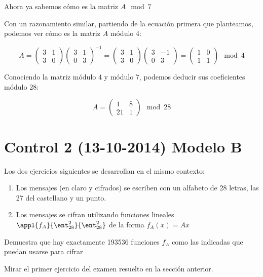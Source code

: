 \begin{problem}[2]
 Ahora ya sabemos cómo es la matriz $A \mod 7$

 Con un razonamiento similar, partiendo de la ecuación primera que planteamos, podemos ver cómo es la matriz $A$ módulo 4:

 \[A = \left( \begin{array}{cc}
  3 & 1 \\
  3 & 0
  \end{array} \right) \left( \begin{array}{cc}
  3 & 1 \\
  0 & 3
  \end{array} \right)^{-1} = \left( \begin{array}{cc}
  3 & 1 \\
  3 & 0
  \end{array} \right) \left( \begin{array}{cc}
  3 & -1 \\
  0 & 3
  \end{array} \right) = \left( \begin{array}{cc}
  1 & 0 \\
  1 & 1
  \end{array} \right) \mod 4\]

 Conociendo la matriz módulo 4 y módulo 7, podemos deducir sus coeficientes módulo 28:

 \[A = \left( \begin{array}{cc}
  1 & 8\\
  21 & 1
  \end{array} \right) \mod 28\]
\end{problem}


\section{Control 2 (13-10-2014) Modelo B}

Los dos ejercicios siguientes se desarrollan en el mismo contexto:

\begin{enumerate}
\item Los mensajes (en claro y cifrados) se escriben con un alfabeto de 28 letras, las 27 del castellano y un punto.

\item Los mensajes se cifran utilizando funciones lineales $\appl{f_A}{\ent_{28}^2}{\ent_{28}^2}$ de la forma $f_A(x) = Ax$
\end{enumerate}

\begin{problem}[1]
Demuestra que hay exactamente 193536 funciones $f_A$ como las indicadas que puedan usarse para cifrar

\solution


Mirar el primer ejercicio del examen resuelto en la sección anterior.

\end{problem}

